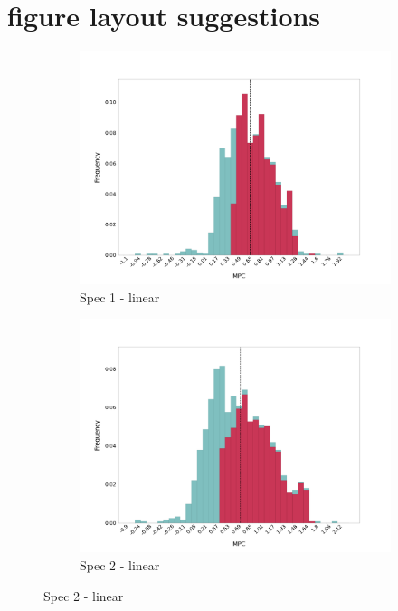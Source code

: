 \section{figure layout suggestions}
\begin{figure}[t]
    \centering
    \begin{subfigure}{0.33\linewidth}
        \includegraphics[width=\linewidth]{figures/distributions/spec1_lin_chTOTexp.png}
        \caption{Spec 1 - linear}
    \end{subfigure}\hfill
    \begin{subfigure}{0.33\linewidth}
        \includegraphics[width=\linewidth]{figures/distributions/spec2_lin_chTOTexp.png}
        \caption{Spec 2 - linear}

\end{subfigure}
\end{figure}
